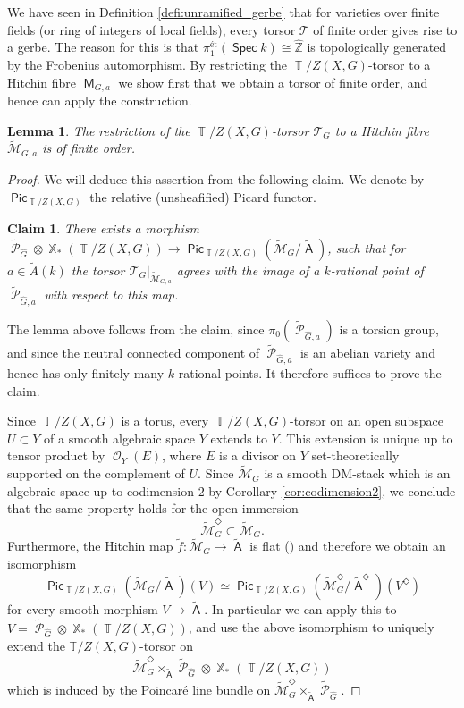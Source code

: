 \documentclass{article}
\DeclareMathOperator{\A}{\mathsf{A}}
\DeclareMathOperator{\Xb}{\mathbb{X}}
\DeclareMathOperator{\M}{\mathsf{M}}
\DeclareMathOperator{\Tb}{\mathbb{T}}
\newcommand{\Mc}{\mathcal{M}}
\DeclareMathOperator{\Pc}{\mathcal{P}}
\DeclareMathOperator{\Spec}{\mathsf{Spec}}
\DeclareMathOperator{\Oo}{\mathcal{O}}
\DeclareMathOperator{\Pic}{\mathsf{Pic}}
\theoremstyle{definition}
\theoremstyle{plain}
\newtheorem{lemma}[definition]{Lemma}
\newtheorem{claim}[definition]{Claim}
\begin{document}
We have seen in Definition \ref{defi:unramified_gerbe} that for varieties over finite fields (or ring of integers of local fields), every torsor $\mathcal{T}$ of finite order gives rise to a gerbe. The reason for this is that $\pi_1^{\text{\'et}}(\Spec k) \cong \widehat{\mathbb{Z}}$ is topologically generated by the Frobenius automorphism. By restricting the $\Tb/Z(X,G)$-torsor to a Hitchin fibre $\M_{G,a}$ we show first that we obtain a torsor of finite order, and hence can apply the construction.

\begin{lemma}
The restriction of the $\Tb/Z(X,G)$-torsor $\mathcal{T}_G$ to a Hitchin fibre $\widetilde{\Mc}_{G,a}$ is of finite order.
\end{lemma}

\begin{proof}
We will deduce this assertion from the following claim. We denote by $\Pic_{\Tb/Z(X,G)}$ the relative (unsheafified) Picard functor.
\begin{claim}
There exists a morphism $\widetilde{\Pc}_{\widehat{G}} \otimes {\Xb_*(\Tb/Z(X,G))} \to \Pic_{\Tb/Z(X,G)}(\widetilde{\Mc}_G/\widetilde{\A})$, such that for $a \in \widetilde{A}(k)$ the torsor $\mathcal{T}_G|_{\widetilde{\Mc}_{G,a}}$ agrees with the image of a $k$-rational point of $\widetilde{\Pc}_{\widehat{G},a}$ with respect to this map. 
\end{claim}
The lemma above follows from the claim, since $\pi_0(\widetilde{\Pc}_{\widehat{G},a})$ is a torsion group, and since the neutral connected component of $\widetilde{\Pc}_{\widehat{G},a}$ is an abelian variety and hence has only finitely many $k$-rational points. It therefore suffices to prove the claim.

Since $\Tb/Z(X,G)$ is a torus, every $\Tb/Z(X,G)$-torsor on an open subspace $U \subset Y$ of a smooth algebraic space $Y$ extends to $Y$. This extension is unique up to tensor product by $\Oo_Y(E)$, where $E$ is a divisor on $Y$ set-theoretically supported on the complement of $U$. Since $\widetilde{\Mc}_G$ is a smooth DM-stack which is an algebraic space up to codimension $2$ by Corollary \ref{cor:codimension2}, we conclude that the same property holds for the open immersion 
$$\widetilde{\Mc}^{\Diamond}_G \subset \widetilde{\Mc}_G.$$
Furthermore, the Hitchin map $\widetilde{f}\colon \widetilde{\Mc}_G \to \widetilde{\A}$ is flat (\cite[Corollaire 4.16.4]{MR2653248}) and therefore we obtain an isomorphism
$$\Pic_{\Tb/Z(X,G)}(\widetilde{\Mc}_G/\widetilde{\A})(V) \simeq \Pic_{\Tb/Z(X,G)}(\widetilde{\Mc}^{\Diamond}_G/\widetilde{\A}^{\Diamond})(V^{\Diamond})$$
for every smooth morphism $V \to \widetilde{\A}$.
In particular we can apply this to $V = \widetilde{\Pc}_{\widehat{G}} \otimes \Xb_*(\Tb/Z(X,G))$, and use the above isomorphism to uniquely extend the $\mathbb{T}/Z(X,G)$-torsor on 
$$\widetilde{\Mc}^{\Diamond}_G \times_{\widetilde{\A}} \widetilde{\Pc}_{\widehat{G}} \otimes \Xb_*(\Tb/Z(X,G))$$
which is induced by the Poincar\'e line bundle on $\widetilde{\Mc}^{\Diamond}_G \times_{\widetilde{\A}} \widetilde{\Pc}_{\widehat{G}}$. 


\end{proof}
\end{document}
